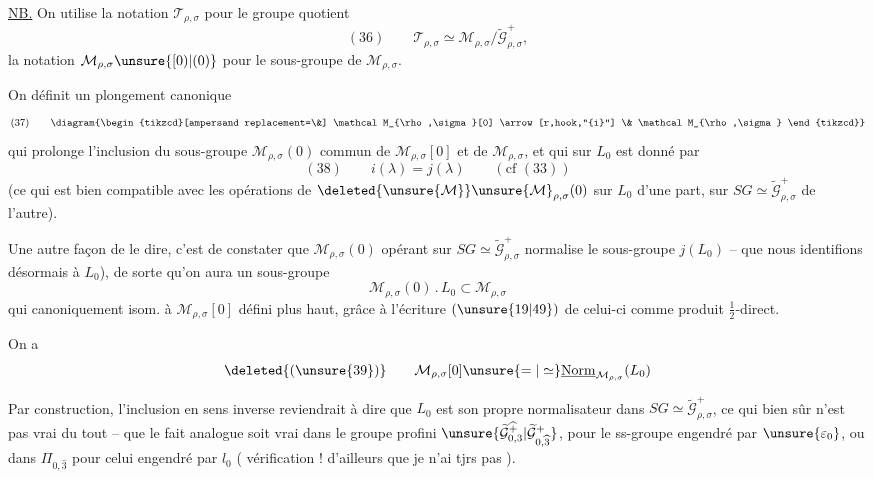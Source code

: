 \uline{NB.} On utilise la notation $\mathcal T_{\rho,\sigma}$ pour le
groupe quotient
\[
(36)\qquad \mathcal T_{\rho,\sigma}\simeq
\mathcal M_{\rho,\sigma}/\widetilde{\mathcal G}_{\rho,\sigma}^{+},
\]
la notation $\mathcal M_{\rho,\sigma}\unsure{[0)|(0)}$ pour le sous-groupe
de $\mathcal M_{\rho,\sigma}$.

On définit un plongement canonique
\[
(37)\qquad
\diagram{\begin{tikzcd}[ampersand replacement=\&]
\mathcal M_{\rho,\sigma}[0] \arrow[r,hook,"{i}"] \& \mathcal M_{\rho,\sigma}
\end{tikzcd}}
\]
qui prolonge l'inclusion du sous-groupe
$\mathcal M_{\rho,\sigma}(0)$ commun de $\mathcal M_{\rho,\sigma}[0]$
et de $\mathcal M_{\rho,\sigma}$,
et qui sur $L_0$ est donné par
\[
(38)\qquad i(\lambda)=j(\lambda)\qquad (\text{cf }(33))
\]
(ce qui est bien compatible avec les opérations de
$\deleted{\unsure{\mathcal M}}\unsure{\mathcal M}_{\rho,\sigma}(0)$
sur $L_0$ d'une part, sur $SG\simeq\widetilde{\mathcal G}_{\rho,\sigma}^{+}$
de l'autre).

\par{}


Une autre façon de le dire, c'est de constater que
$\mathcal M_{\rho,\sigma}(0)$ opérant sur
$SG\simeq\widetilde{\mathcal G}_{\rho,\sigma}^{+}$
normalise le sous-groupe $j(L_0)$ -- que nous
identifions désormais à $L_0$), de sorte qu'on
aura un sous-groupe
\[
\mathcal M_{\rho,\sigma}(0)\mathbin{.}L_0\subset\mathcal M_{\rho,\sigma}
\]
qui  canoniquement isom. à $\mathcal M_{\rho,\sigma}[0]$
défini plus haut, grâce à l'écriture $(\unsure{19|49})$ de
celui-ci comme produit $\frac12$-direct.

 On a
\[
\deleted{(\unsure{39})}\qquad
\mathcal M_{\rho,\sigma}[0]\unsure{=|\simeq}
\underline{\operatorname{Norm}}_{\mathcal M_{\rho,\sigma}}(L_0)
\]

Par construction, 
l'inclusion en sens inverse reviendrait à dire que $L_0$
est son propre normalisateur dans $SG\simeq\widetilde{\mathcal G}_{\rho,\sigma}^{+}$,
ce qui bien sûr n'est pas vrai du tout
--  que le fait analogue soit vrai
dans le groupe profini
$\unsure{\widetilde{\mathcal G}_{0,3}^{\widehat{+}}|\widetilde{\mathcal G}_{0,\widehat{3}}^{+}}$,
pour le ss-groupe engendré par $\unsure{\varepsilon_0}$,
ou dans $\Pi_{0,\widehat{3}}$ pour
celui engendré par $l_0$ ( vérification !
d'ailleurs que je n'ai tjrs pas ).

